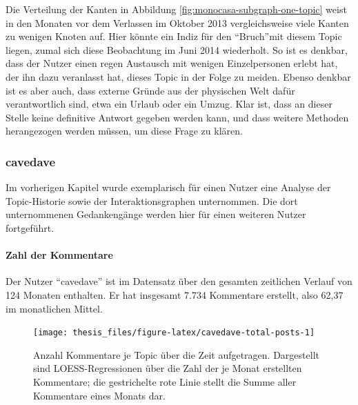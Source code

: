 \documentclass[11pt,a4paper,twoside]{article}
\let\oldpar\paragraph
\renewcommand{\paragraph}{\oldpar*}
\begin{document}
Die Verteilung der Kanten in Abbildung
\ref{fig:monocasa-subgraph-one-topic} weist in den Monaten vor dem
Verlassen im Oktober 2013 vergleichsweise viele Kanten zu wenigen Knoten
auf. Hier könnte ein Indiz für den \enquote{Bruch}mit diesem Topic
liegen, zumal sich diese Beobachtung im Juni 2014 wiederholt. So ist es
denkbar, dass der Nutzer einen regen Austausch mit wenigen
Einzelpersonen erlebt hat, der ihn dazu veranlasst hat, dieses Topic in
der Folge zu meiden. Ebenso denkbar ist es aber auch, dass externe
Gründe aus der physischen Welt dafür verantwortlich sind, etwa ein
Urlaub oder ein Umzug. Klar ist, dass an dieser Stelle keine definitive
Antwort gegeben werden kann, und dass weitere Methoden herangezogen
werden müssen, um diese Frage zu klären.

\hypertarget{cavedave}{%
\subsubsection{cavedave}\label{cavedave}}

\FloatBarrier

Im vorherigen Kapitel wurde exemplarisch für einen Nutzer eine Analyse
der Topic-Historie sowie der Interaktionsgraphen unternommen. Die dort
unternommenen Gedankengänge werden hier für einen weiteren Nutzer
fortgeführt.

\hypertarget{zahl-der-kommentare}{%
\paragraph{Zahl der Kommentare}\label{zahl-der-kommentare}}

Der Nutzer \enquote{cavedave} ist im Datensatz über den gesamten
zeitlichen Verlauf von 124 Monaten enthalten. Er hat insgesamt 7.734
Kommentare erstellt, also 62,37 im monatlichen Mittel.






\begin{figure}

{\centering \texttt{[image: thesis\_files/figure-latex/cavedave-total-posts-1]} 

}

\caption{Anzahl Kommentare je Topic über die Zeit
aufgetragen. Dargestellt sind LOESS-Regressionen über die Zahl der je
Monat erstellten Kommentare; die gestrichelte rote Linie stellt die
Summe aller Kommentare eines Monats dar.}\label{fig:cavedave-total-posts}
\end{figure}
\end{document}
